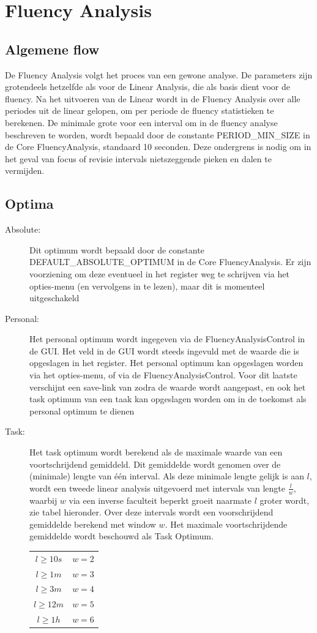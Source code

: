 \documentclass[a4paper,11pt]{report}
\begin{document}
\section{Fluency Analysis}
\subsection{Algemene flow}
De Fluency Analysis volgt het proces van een gewone analyse. De parameters zijn grotendeels hetzelfde als voor de Linear Analysis, die als basis dient voor de fluency. Na het uitvoeren van de Linear wordt in de Fluency Analysis over alle periodes uit de linear gelopen, om per periode de fluency statistieken te berekenen. De minimale grote voor een interval om in de fluency analyse beschreven te worden, wordt bepaald door de constante PERIOD\_MIN\_SIZE in de Core FluencyAnalysis, standaard 10 seconden. Deze ondergrens is nodig om in het geval van focus of revisie intervals nietszeggende pieken en dalen te vermijden.
\subsection{Optima}
\begin{description}
\item[Absolute:] Dit optimum wordt bepaald door de constante \hfill\\DEFAULT\_ABSOLUTE\_OPTIMUM in de Core FluencyAnalysis. Er zijn voorziening om deze eventueel in het register weg te schrijven via het opties-menu (en vervolgens in te lezen), maar dit is momenteel uitgeschakeld
\item[Personal:] Het personal optimum wordt ingegeven via de FluencyAnalysisControl in de GUI. Het veld in de GUI wordt steeds ingevuld met de waarde die is opgeslagen in het register. Het personal optimum kan opgeslagen worden via het opties-menu, of via de FluencyAnalysisControl. Voor dit laatste verschijnt een save-link van zodra de waarde wordt aangepast, en ook het task optimum van een taak kan opgeslagen worden om in de toekomst als personal optimum te dienen
\item[Task:] Het task optimum wordt berekend als de maximale waarde van een voortschrijdend gemiddeld. Dit gemiddelde wordt genomen over de (minimale) lengte van \'e\'en interval. Als deze minimale lengte gelijk is aan $l$, wordt een tweede linear analysis uitgevoerd met intervals van lengte $\frac{l}{w}$, waarbij $w$ via een inverse faculteit beperkt groeit naarmate $l$ groter wordt, zie tabel hieronder. Over deze intervals wordt een voorschrijdend gemiddelde berekend met window $w$. Het maximale voortschrijdende gemiddelde wordt beschouwd als Task Optimum.\\
\begin{tabular}{c|c}
$l \geq 10s$ &$w = 2$\\
$l \geq 1m$ &$w = 3$\\
$l \geq 3m$ &$w = 4$\\
$l \geq 12m$ &$w = 5$\\
$l \geq 1h$ &$w = 6$\\
\end{tabular}
\end{description}
\end{document}
